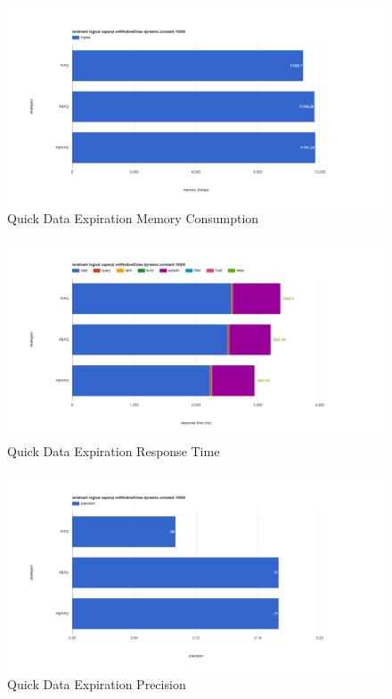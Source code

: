 \begin{figure}[!htbp]
	\centering
    \includegraphics[width=6.5in]{img/app3-ets-quick-m.png}
    \caption{Quick Data Expiration Memory Consumption}
\end{figure}
\begin{figure}[!htpb]
	\centering
    \includegraphics[width=6.5in]{img/app3-ets-quick-r.png}
    \caption{Quick Data Expiration Response Time}
\end{figure}
\begin{figure}[!htbp]
	\centering
    \includegraphics[width=6.5in]{img/app3-ets-quick-p.png}
    \caption{Quick Data Expiration Precision}
\end{figure}
